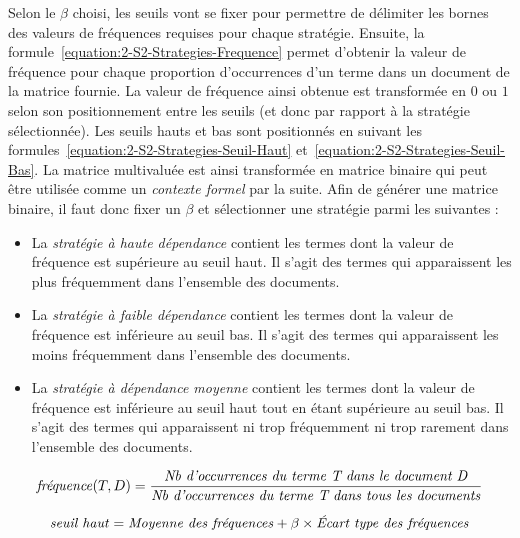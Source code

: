 \bigskip

Selon le $ \beta $ choisi, les seuils vont se fixer pour permettre de délimiter les bornes des valeurs de fréquences requises pour chaque stratégie.
Ensuite, la formule~\eqref{equation:2-S2-Strategies-Frequence} permet d'obtenir la valeur de fréquence pour chaque proportion d'occurrences d'un terme dans un document de la matrice fournie.
La valeur de fréquence ainsi obtenue est transformée en $ 0 $ ou $ 1 $ selon son positionnement entre les seuils (et donc par rapport à la stratégie sélectionnée).
Les seuils hauts et bas sont positionnés en suivant les formules~\eqref{equation:2-S2-Strategies-Seuil-Haut} et~\eqref{equation:2-S2-Strategies-Seuil-Bas}.
La matrice multivaluée est ainsi transformée en matrice binaire qui peut être utilisée comme un \textit{contexte formel} par la suite.
Afin de générer une matrice binaire, il faut donc fixer un $ \beta $ et sélectionner une stratégie parmi les suivantes :
\begin{itemize}
\item La \textit{stratégie à haute dépendance} contient les termes dont la valeur de fréquence est supérieure au seuil haut.
Il s'agit des termes qui apparaissent les plus fréquemment dans l'ensemble des documents.
\item La \textit{stratégie à faible dépendance} contient les termes dont la valeur de fréquence est inférieure au seuil bas.
Il s'agit des termes qui apparaissent les moins fréquemment dans l'ensemble des documents.
\item La \textit{stratégie à dépendance moyenne} contient les termes dont la valeur de fréquence est inférieure au seuil haut tout en étant supérieure au seuil bas.
Il s'agit des termes qui apparaissent ni trop fréquemment ni trop rarement dans l'ensemble des documents.
\end{itemize}

\begin{equation}
\text{\textit{fréquence}}(T, D) = \frac{\text{\textit{Nb d'occurrences du terme T dans le document D}}}{\text{\textit{Nb d'occurrences du terme T dans tous les documents}}}
\label{equation:2-S2-Strategies-Frequence}
\end{equation}

\begin{equation}
\text{\textit{seuil haut}} = \text{\textit{Moyenne des fréquences}} + \beta \times \text{\textit{Écart type des fréquences}}
\label{equation:2-S2-Strategies-Seuil-Haut}
\end{equation}

